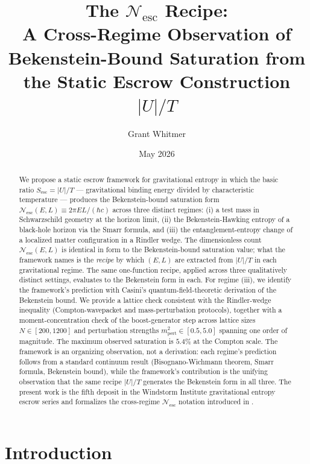 \documentclass[11pt]{article}
\title{The $\mathcal{N}_{\mathrm{esc}}$ Recipe: \\
A Cross-Regime Observation of Bekenstein-Bound Saturation from the Static Escrow Construction $|U|/T$}
\author{Grant Whitmer}
\date{May 2026}
\begin{document}
\maketitle

\begin{abstract}
We propose a static escrow framework for gravitational entropy in which the basic ratio $S_{\mathrm{esc}} = |U|/T$ — gravitational binding energy divided by characteristic temperature — produces the Bekenstein-bound saturation form $\mathcal{N}_{\mathrm{esc}}(E, L) \equiv 2\pi E L/(\hbar c)$ across three distinct regimes: (i) a test mass in Schwarzschild geometry at the horizon limit, (ii) the Bekenstein-Hawking entropy of a black-hole horizon via the Smarr formula, and (iii) the entanglement-entropy change of a localized matter configuration in a Rindler wedge. The dimensionless count $\mathcal{N}_{\mathrm{esc}}(E, L)$ is identical in form to the Bekenstein-bound saturation value; what the framework names is the \emph{recipe} by which $(E, L)$ are extracted from $|U|/T$ in each gravitational regime. The same one-function recipe, applied across three qualitatively distinct settings, evaluates to the Bekenstein form in each. For regime (iii), we identify the framework's prediction with Casini's quantum-field-theoretic derivation of the Bekenstein bound. We provide a lattice check consistent with the Rindler-wedge inequality (Compton-wavepacket and mass-perturbation protocols), together with a moment-concentration check of the boost-generator step across lattice sizes $N \in [200, 1200]$ and perturbation strengths $m_{\mathrm{pert}}^2 \in [0.5, 5.0]$ spanning one order of magnitude. The maximum observed saturation is $5.4\%$ at the Compton scale. The framework is an organizing observation, not a derivation: each regime's prediction follows from a standard continuum result (Bisognano-Wichmann theorem, Smarr formula, Bekenstein bound), while the framework's contribution is the unifying observation that the same recipe $|U|/T$ generates the Bekenstein form in all three. The present work is the fifth deposit in the Windstorm Institute gravitational entropy escrow series \cite{Whitmer2026Phonon, Whitmer2026Escrow, Whitmer2026C8, Whitmer2026Lattice, Whitmer2026Translation} and formalizes the cross-regime $\mathcal{N}_{\mathrm{esc}}$ notation introduced in \cite{Whitmer2026Translation}.
\end{abstract}

\section{Introduction}
\end{document}
